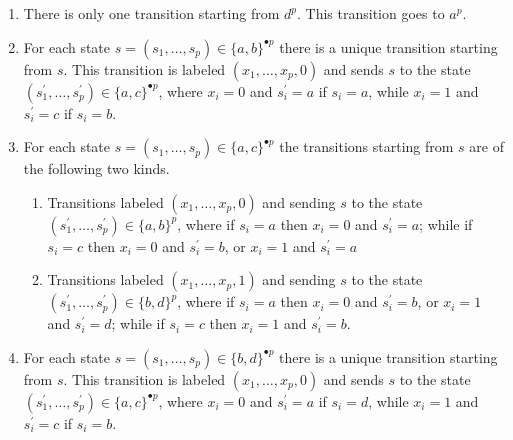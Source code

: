 \documentclass[11pt]{article}
\theoremstyle{remark}\newtheorem{remark}[theorem]{Remark}
\begin{document}
\begin{enumerate}[label={\footnotesize(t\arabic*)},labelindent=1em,itemsep=0.5em,topsep=0.5em]
\begin{enumerate}[label={\footnotesize(t3\roman*)},labelindent=1em,itemsep=0.5em,topsep=0.5em]
		\item A unique transition with labels $(0, \dots, 0)$ and $(1, \dots, 1)$ that goes to $b^p$.
		
		\item A unique transition labeled $(1, \dots, 1, 0)$ that goes to $a^p$.
		
	\end{enumerate}
	
	\item\label{ite:t4} There is only one transition starting from $d^p$.
	This transition goes to $a^p$.
	
	\item\label{ite:t5} For each state $s = (s_1, \dots, s_p) \in \{a, b\}^{\bullet p}$ there is a unique transition starting from $s$.
	This transition is labeled $(x_1, \dots, x_p, 0)$ and sends $s$ to the state $(s_1^\prime, \dots, s_p^\prime) \in \{a, c\}^{\bullet p}$, where $x_i = 0$ and $s_i^\prime = a$ if $s_i = a$, while $x_i = 1$ and  $s_i^\prime = c$ if $s_i = b$.
	
	\item\label{ite:t6} For each state $s = (s_1, \dots, s_p) \in \{a, c\}^{\bullet p}$ the transitions starting from $s$ are of the following two kinds.
	\vspace{0.5em}
	\begin{enumerate}[label={\footnotesize(t6\roman*)},labelindent=1em,itemsep=0.5em,topsep=0.5em]
		\setlength\itemsep{0.5em}
		\item Transitions labeled $(x_1, \dots, x_p, 0)$ and sending $s$ to the state $(s_1^\prime, \dots, s_p^\prime) \in \{a, b\}^p$, where if $s_i = a$ then $x_i = 0$ and $s_i^\prime = a$; while if $s_i = c$ then $x_i = 0$ and $s_i^\prime = b$, or $x_i = 1$ and $s_i^\prime = a$
		
		\item Transitions labeled $(x_1, \dots, x_p, 1)$ and sending $s$ to the state $(s_1^\prime, \dots, s_p^\prime) \in \{b, d\}^p$, where if $s_i = a$ then $x_i = 0$ and $s_i^\prime = b$, or $x_i = 1$ and $s_i^\prime = d$; while if $s_i = c$ then $x_i = 1$ and $s_i^\prime = b$.
		
	\end{enumerate}
	
	\item\label{ite:t7} For each state $s = (s_1, \dots, s_p) \in \{b, d\}^{\bullet p}$ there is a unique transition starting from $s$.
	This transition is labeled $(x_1, \dots, x_p, 0)$ and sends $s$ to the state $(s_1^\prime, \dots, s_p^\prime) \in \{a, c\}^{\bullet p}$, where $x_i = 0$ and $s_i^\prime = a$ if $s_i = d$, while $x_i = 1$ and $s_i^\prime = c$ if $s_i = b$.
	
\end{enumerate}
\end{document}
